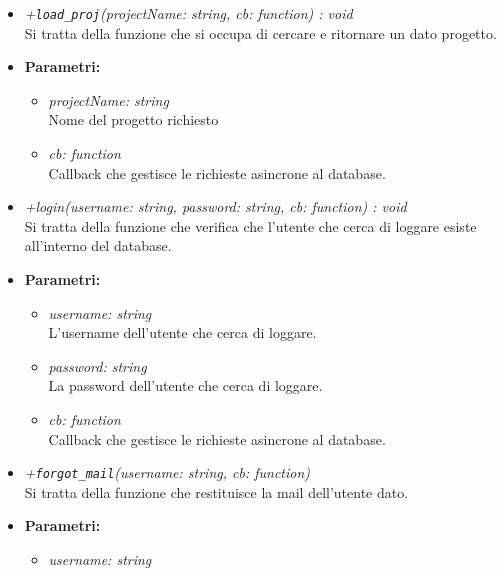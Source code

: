 \begin{itemize}
\begin{itemize}
            \item \emph{+\texttt{load\_proj}(projectName: string, cb: function) : void }\\
            Si tratta della funzione che si occupa di cercare e ritornare un dato progetto.\\
            \item \textbf{Parametri: }\\
            \begin{itemize}
              \item \emph{projectName: string}\\
              Nome del progetto richiesto
              \item \emph{cb: function}\\
              Callback che gestisce le richieste asincrone al database.
            \end{itemize}
            \item \emph{+login(username: string, password: string, cb: function) : void}\\
            Si tratta della funzione che verifica che l'utente che cerca di loggare esiste all'interno del database.\\
            \item \textbf{Parametri: }\\
            \begin{itemize}
              \item \emph{username: string}\\
              L'username dell'utente che cerca di loggare.
              \item \emph{password: string}\\
              La password dell'utente che cerca di loggare.
              \item \emph{cb: function}\\
              Callback che gestisce le richieste asincrone al database.
            \end{itemize}
            \item \emph{+\texttt{forgot\_mail}(username: string, cb: function)}\\
            Si tratta della funzione che restituisce la mail dell'utente dato.\\
            \item \textbf{Parametri: }\\
            \begin{itemize}
              \item \emph{username: string}\\

\end{itemize}
\end{itemize}
\end{itemize}
